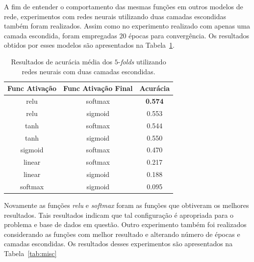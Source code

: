 \documentclass[conference]{IEEEtran}
\begin{document}
A fim de entender o comportamento das mesmas funções em outros modelos de rede, experimentos com redes neurais utilizando duas camadas escondidas também foram realizados. Assim como no experimento realizado com apenas uma camada escondida, foram empregadas $20$ épocas para convergência. Os resultados obtidos por esses modelos são apresentados na Tabela~\ref{tab:2hl}.

\begin{table}[h!]
	\centering	
	\begin{tabular}{ccc} \toprule
		\textbf{Func Ativação} & \textbf{Func Ativação Final} & \textbf{Acurácia} \\ \toprule 	
		relu                   & softmax                      & \textbf{0.574}             \\
		relu                   & sigmoid                      & 0.553             \\
		tanh                   & softmax                      & 0.544             \\
		tanh                   & sigmoid                      & 0.550             \\
		sigmoid                & softmax                      & 0.470             \\
		linear                 & softmax                      & 0.217             \\
		linear                 & sigmoid                      & 0.188             \\
		softmax                & sigmoid                      & 0.095             \\ \bottomrule      
	\end{tabular}
	\caption{\small Resultados de acurácia média dos $5$-\emph{folds} utilizando redes neurais com duas camadas escondidas.}
	\label{tab:2hl}
\end{table}

Novamente as funções \emph{relu} e \emph{softmax} foram as funções que obtiveram os melhores resultados. Tais resultados indicam que tal configuração é apropriada para o problema e base de dados em questão. Outro experimento também foi realizados considerando as funções com melhor resultado e alterando número de épocas e camadas escondidas. Os resultados desses experimentos são apresentados na Tabela~\ref{tab:misc} 
\end{document}
